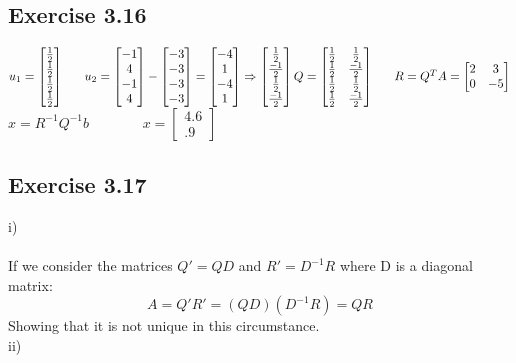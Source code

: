 \documentclass[letterpaper,12pt]{article}
\theoremstyle{definition}
\begin{document}
\subsection*{Exercise 3.16}
$u_1 = \begin{bmatrix}
\frac{1}{2}\\
\frac{1}{2}\\
\frac{1}{2}\\
\frac{1}{2}\\
\end{bmatrix}~~~~~
u_2 = \begin{bmatrix}
-1\\
4\\
-1\\
4
\end{bmatrix} - \begin{bmatrix}
-3\\
-3\\
-3\\
-3
\end{bmatrix} = \begin{bmatrix}
-4\\
1\\
-4\\
1
\end{bmatrix}\Rightarrow \begin{bmatrix}
\frac{1}{2}\\
\frac{-1}{2}\\
\frac{1}{2}\\
\frac{-1}{2}\\
\end{bmatrix}\\
Q = \begin{bmatrix}
\frac{1}{2}&\frac{1}{2}\\
\frac{1}{2}&\frac{-1}{2}\\
\frac{1}{2}&\frac{1}{2}\\
\frac{1}{2}&\frac{-1}{2}\\
\end{bmatrix} ~~~~~
R = Q^TA = \begin{bmatrix}
2 & 3\\
0 & -5\\
\end{bmatrix}
$\\
$x = R^{-1}Q^{-1}b$
~~~~~~~$x = \begin{bmatrix}
4.6\\
.9
\end{bmatrix}$

\subsection*{Exercise 3.17}
i) \\ \\
If we consider the matrices $Q'=QD$ and $R'= D^{-1}R$ where D is a diagonal matrix:
\[ A = Q'R' = (QD)(D^{-1}R) = QR  \]
Showing that it is not unique in this circumstance. \\ 
ii) \\ \\
\end{document}
